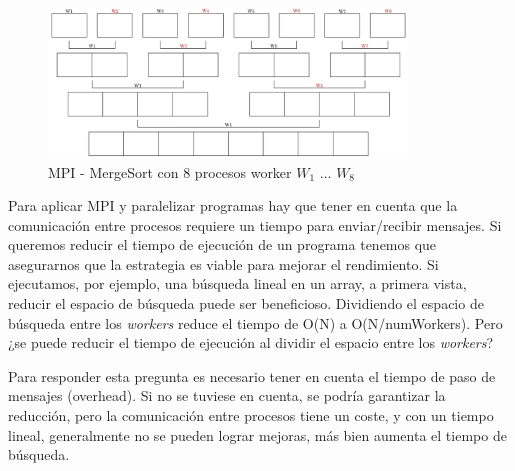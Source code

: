 	\vspace{0.2cm}
	
	\begin{figure}[!h]
		\centering
		\includegraphics[width=0.85\textwidth]{images/chapter_3/mergesort_mpi}
		\caption{MPI - MergeSort con 8 procesos worker \(W_{1}\) ... \(W_{8}\)}
		\label{fig:mergesortmpi}
	\end{figure}


	
	Para aplicar MPI y paralelizar programas hay que tener en cuenta que la comunicación entre procesos requiere un tiempo para enviar/recibir mensajes. Si queremos reducir el tiempo de ejecución de un programa tenemos que asegurarnos que la estrategia es viable para mejorar el rendimiento. Si ejecutamos, por ejemplo, una búsqueda lineal en un array, a primera vista, reducir el espacio de búsqueda puede ser beneficioso. Dividiendo el espacio de búsqueda entre los \textit{workers} reduce el tiempo de O(N) a O(N/numWorkers). Pero ¿se puede reducir el tiempo de ejecución al dividir el espacio entre los \textit{workers}? 
	
	Para responder esta pregunta es necesario tener en cuenta el tiempo de paso de mensajes (overhead). Si no se tuviese en cuenta, se podría garantizar la reducción, pero la comunicación entre procesos tiene un coste, y con un tiempo lineal, generalmente no se pueden lograr mejoras, más bien aumenta el tiempo de búsqueda.
	
